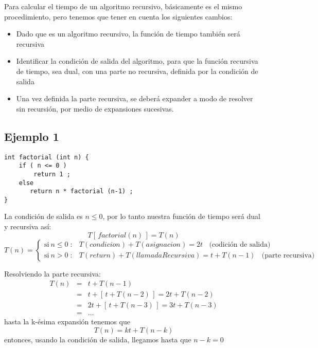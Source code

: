 Para calcular el tiempo de un algoritmo recursivo, básicamente es el
mismo procedimiento, pero tenemos que tener en cuenta los siguientes
cambios:

\begin{itemize}
\item Dado que es un algoritmo recursivo, la función de tiempo también
  será recursiva
\item Identificar la condición de salida del algoritmo, para que la
  función recursiva de tiempo, sea dual, con una parte no recursiva,
  definida por la condición de salida
\item Una vez definida la parte recursiva, se deberá expander a modo
  de resolver sin recursión, por medio de expansiones sucesivas.
\end{itemize}

\subsection{Ejemplo 1}
\label{sec:ejemplo-1}

\begin{verbatim}
int factorial (int n) {
    if ( n <= 0 )
        return 1 ;
    else
       return n * factorial (n-1) ;
}
\end{verbatim}

La condición de salida es $n \leq 0$, por lo tanto nuestra función de tiempo
será dual y recursiva así:
$$T[\,factorial(n)\,]=T(n)$$
\begin{equation*}
  \label{eq:definicion por partes}
  T(n) = \left\{
    \begin{array}{ll}
      \mathrm{si\ } n \le 0 \; :    &  T(condicion)+T(asignacion)=2t \;\; \text{ (codición de salida)}\\
      \mathrm{si\ } n > 0 \; : &  T(return)+T(llamadaRecursiva)=t+T(n-1) \;\; \text{ (parte recursiva)}
    \end{array}
  \right.
\end{equation*}


Resolviendo la parte recursiva:
\begin{eqnarray*}
  T(n) &=& t + T(n-1)\\
       &=& t + [\, t + T(n-2)\, ] = 2t + T (n-2)\\
       &=& 2t + [\, t + T(n-3) \,] = 3t + T (n-3)\\
       &=& \ldots
\end{eqnarray*}
hasta la k-ésima expansión tenemos que
$$ T(n) = kt + T (n-k)$$
entonces, usando la condición de salida, llegamos hasta que $n-k=0$

